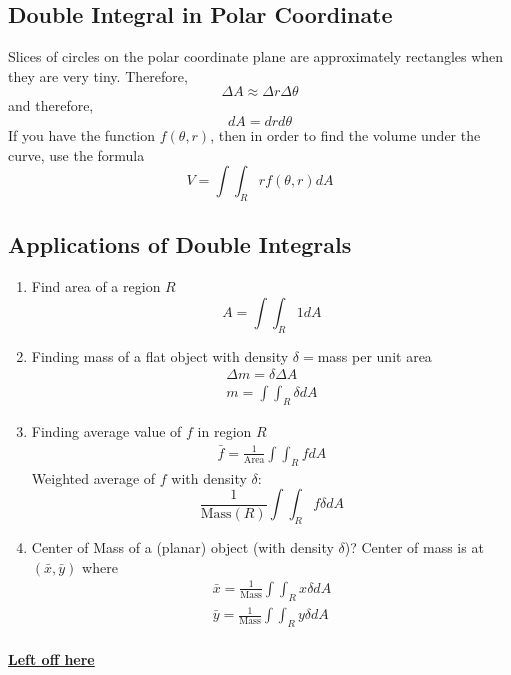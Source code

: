 \documentclass[12pt]{article}
\theoremstyle{break}
\numberwithin{theorem}{subsection}
\numberwithin{lemma}{subsection}
\numberwithin{corollary}{subsection}
\numberwithin{equation}{subsection}
\begin{document}
\subsection{Double Integral in Polar Coordinate}
Slices of circles on the polar coordinate plane are approximately rectangles when they are very tiny. Therefore,
\begin{equation*}
	\Delta A \approx \Delta r \Delta \theta
\end{equation*}
and therefore, 
\begin{equation*}
	dA = dr d\theta
\end{equation*}
If you have the function $f(\theta,r)$, then in order to find the volume under the curve, use the formula
\begin{equation*}
	V = \int \int_R rf(\theta,r) dA
\end{equation*}

\subsection{Applications of Double Integrals}
\begin{enumerate}
	\item Find area of a region $R$
	\begin{equation*}
		A = \int \int_R 1 dA 
	\end{equation*}
	\item Finding mass of a flat object with density $\delta = $mass per unit area
	\begin{align*}
		\Delta m = \delta \Delta A \\
		m = \int \int_R \delta dA
	\end{align*}
	\item Finding average value of $f$ in region $R$
	\begin{align*}
		\bar f = \frac1{\text{Area}} \int \int_R f dA
	\end{align*}
	Weighted average of $f$ with density $\delta$: 
	\begin{equation*}
		\frac1{\text{Mass}(R)} \int \int_R f \delta dA
	\end{equation*}
	\item Center of Mass of a (planar) object (with density $\delta$)? \newline
		Center of mass is at $(\bar x, \bar y)$ where 
		\begin{align*}
			\bar x = \frac1{\text{Mass}} \int \int_R x \delta dA \\
			\bar y = \frac1{\text{Mass}} \int \int_R y \delta dA \\
		\end{align*}
\end{enumerate}

\href{https://youtu.be/60e4hdCi1D4?t=1308}{\bf Left off here}
\end{document}
